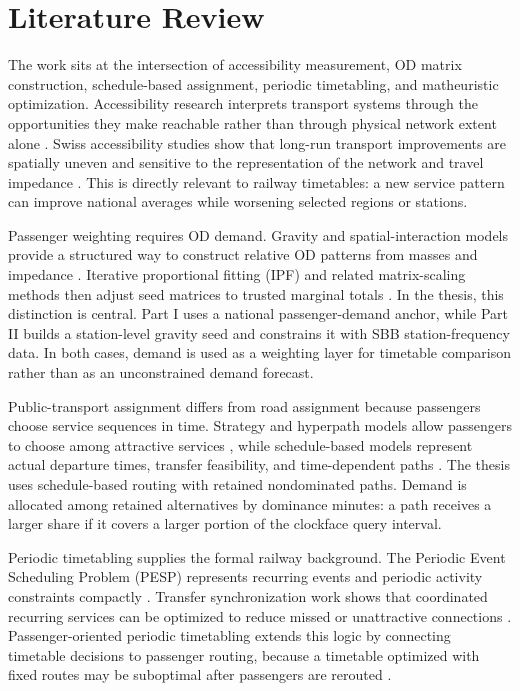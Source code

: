 \documentclass[conference]{IEEEtran}
\begin{document}
\section{Literature Review}
The work sits at the intersection of accessibility measurement, OD matrix construction, schedule-based assignment, periodic timetabling, and matheuristic optimization. Accessibility research interprets transport systems through the opportunities they make reachable rather than through physical network extent alone \cite{hansen1959accessibility,geurs2004accessibility}. Swiss accessibility studies show that long-run transport improvements are spatially uneven and sensitive to the representation of the network and travel impedance \cite{froehlichTschoppAxhausen2005Accessibility,axhausen2011swissaccessibility}. This is directly relevant to railway timetables: a new service pattern can improve national averages while worsening selected regions or stations.

Passenger weighting requires OD demand. Gravity and spatial-interaction models provide a structured way to construct relative OD patterns from masses and impedance \cite{wilson1970entropy,fotheringham1983CompetingDestinations}. Iterative proportional fitting (IPF) and related matrix-scaling methods then adjust seed matrices to trusted marginal totals \cite{demingStephan1940IPF,fienberg1970IPF,sinkhorn1964MatrixScaling}. In the thesis, this distinction is central. Part I uses a national passenger-demand anchor, while Part II builds a station-level gravity seed and constrains it with SBB station-frequency data. In both cases, demand is used as a weighting layer for timetable comparison rather than as an unconstrained demand forecast.

Public-transport assignment differs from road assignment because passengers choose service sequences in time. Strategy and hyperpath models allow passengers to choose among attractive services \cite{spiessFlorian1989OptimalStrategies,nguyenPallottino1988TransitAssignment}, while schedule-based models represent actual departure times, transfer feasibility, and time-dependent paths \cite{nuzzoloRussoCrisalli2001ScheduleAssignment}. The thesis uses schedule-based routing with retained nondominated paths. Demand is allocated among retained alternatives by dominance minutes: a path receives a larger share if it covers a larger portion of the clockface query interval.

Periodic timetabling supplies the formal railway background. The Periodic Event Scheduling Problem (PESP) represents recurring events and periodic activity constraints compactly \cite{serafini1989periodic,liebchen2007pesp}. Transfer synchronization work shows that coordinated recurring services can be optimized to reduce missed or unattractive connections \cite{nachtigallVoget1997FixedInterval,cederGolanyTal2001Synchronization}. Passenger-oriented periodic timetabling extends this logic by connecting timetable decisions to passenger routing, because a timetable optimized with fixed routes may be suboptimal after passengers are rerouted \cite{schiewe2020integrated}.
\end{document}
